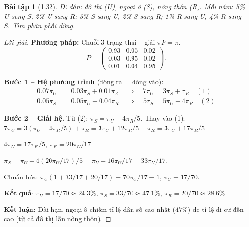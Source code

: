 \documentclass[8pt,a4paper]{article}
\newtheorem{exercise}{Bài tập}
\newenvironment{solution}{\begin{proof}[Lời giải]}{\end{proof}}
\begin{document}
\begin{exercise}[1.32]
Di dân: đô thị (U), ngoại ô (S), nông thôn (R). Mỗi năm: 5\% U sang S, 2\% U sang R; 3\% S sang U, 2\% S sang R; 1\% R sang U, 4\% R sang S. Tìm phân phối dừng.
\end{exercise}
\begin{solution}
\textbf{Phương pháp:} Chuỗi 3 trạng thái -- giải $\pi P = \pi$.
\[
  P = \begin{pmatrix} 0.93 & 0.05 & 0.02 \\ 0.03 & 0.95 & 0.02 \\ 0.01 & 0.04 & 0.95 \end{pmatrix}.
\]

\textbf{Bước 1 -- Hệ phương trình} (dòng ra = dòng vào):
\begin{align*}
  0.07\pi_U &= 0.03\pi_S + 0.01\pi_R \quad \Rightarrow \quad 7\pi_U = 3\pi_S + \pi_R \quad (1) \\
  0.05\pi_S &= 0.05\pi_U + 0.04\pi_R \quad \Rightarrow \quad 5\pi_S = 5\pi_U + 4\pi_R \quad (2)
\end{align*}

\textbf{Bước 2 -- Giải hệ.}
Từ (2): $\pi_S = \pi_U + 4\pi_R/5$. Thay vào (1): $7\pi_U = 3(\pi_U + 4\pi_R/5) + \pi_R = 3\pi_U + 12\pi_R/5 + \pi_R = 3\pi_U + 17\pi_R/5$.

$4\pi_U = 17\pi_R/5$, $\pi_R = 20\pi_U/17$.

$\pi_S = \pi_U + 4(20\pi_U/17)/5 = \pi_U + 16\pi_U/17 = 33\pi_U/17$.

Chuẩn hóa: $\pi_U(1 + 33/17 + 20/17) = 70\pi_U/17 = 1$, $\pi_U = 17/70$.

\textbf{Kết quả}: $\pi_U = 17/70 \approx 24.3\%$, $\pi_S = 33/70 \approx 47.1\%$, $\pi_R = 20/70 \approx 28.6\%$.

\textbf{Kết luận}: Dài hạn, ngoại ô chiếm tỉ lệ dân số cao nhất ($47\%$) do tỉ lệ di cư đến cao (từ cả đô thị lẫn nông thôn).
\end{solution}
\end{document}
